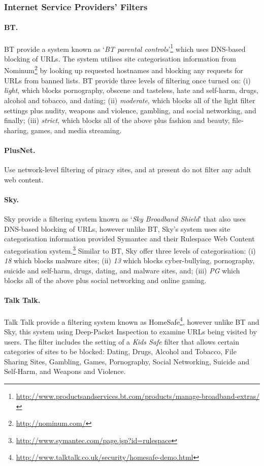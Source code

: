 \documentclass{bmcart}
\begin{document}
\subsubsection*{Internet Service Providers' Filters}
\paragraph{BT.}
BT provide a system known as `\textit{BT parental controls}'\footnote{\url{http://www.productsandservices.bt.com/products/manage-broadband-extras/}} which uses DNS-based blocking of URLs.
The system utilises site categorisation information from Nominum\footnote{\url{http://nominum.com/}} by looking up requested hostnames and blocking any requests for URLs from banned lists.
BT provide three levels of filtering once turned on: (i) \textit{light}, which blocks pornography, obscene and tasteless, hate and self-harm, drugs, alcohol and tobacco, and dating; (ii) \textit{moderate}, which blocks all of the light filter settings plus nudity, weapons and violence, gambling, and social networking, and finally; (iii) \textit{strict}, which blocks all of the above plus fashion and beauty, file-sharing, games, and media streaming.

\paragraph{PlusNet.}
Use network-level filtering of piracy sites, and at present do not filter any adult web content.

\paragraph{Sky.}
Sky provide a filtering system known as `\textit{Sky Broadband Shield}' that also uses DNS-based blocking of URLs, however unlike BT, Sky's system uses site categorisation information provided Symantec and their Rulespace Web Content categorisation system.\footnote{\url{http://www.symantec.com/page.jsp?id=rulespace}} 
Similar to BT, Sky offer three levels of categorisation: (i) \textit{18} which blocks malware sites; (ii) \textit{13} which blocks cyber-bullying, pornography, suicide and self-harm, drugs, dating, and malware sites, and; (iii) \textit{PG} which blocks all of the above plus social networking and online gaming.

\paragraph{Talk Talk.}
Talk Talk provide a filtering system known as HomeSafe\footnote{\url{http://www.talktalk.co.uk/security/homesafe-demo.html}}, however unlike BT and Sky, this system using Deep-Packet Inspection to examine URLs being visited by users.
The filter includes the setting of a \textit{Kids Safe} filter that allows certain categories of sites to be blocked: Dating, Drugs, Alcohol and Tobacco, File Sharing Sites, Gambling, Games, Pornography, Social Networking, Suicide and Self-Harm, and Weapons and Violence.
\end{document}
